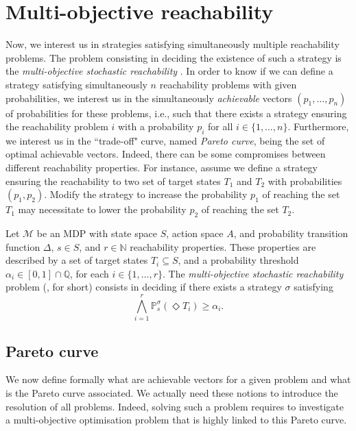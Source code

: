 \section{Multi-objective reachability}
\label{mosr-section}
Now, we interest us in strategies satisfying simultaneously multiple reachability problems.
The problem consisting in deciding the existence of
such a strategy is the \textit{multi-objective stochastic reachability} \cite{DBLP:journals/lmcs/EtessamiKVY08}.
In order to know if we can define a strategy satisfying simultaneously $n$ reachability problems with given probabilities, we interest us in the simultaneously \textit{achievable} vectors $(p_1, \dots, p_n)$ of probabilities for these problems, i.e., such that there exists a strategy ensuring the reachability problem $i$ with a probability $p_i$ for all $i \in \{1, \dots, n\}$.
Furthermore, we interest us in the ``trade-off" curve, named \textit{Pareto curve}, being the set of optimal achievable vectors.
Indeed, there can be some compromises between different reachability properties. For instance,
assume we define a strategy ensuring the reachability to two set of target states $T_1$ and $T_2$ with probabilities $(p_1, p_2)$.
 Modify the strategy to increase the probability $p_1$ of reaching the set $T_1$ may necessitate to lower the probability $p_2$ of reaching the set $T_2$.

\begin{definition}
  Let $\mathcal{M}$ be an MDP with state space $S$, action space $A$, and probability transition function $\Delta$, $s \in S$, and $r \in \mathbb{N}$ reachability properties.
  These properties are described by a set of target states $T_i \subseteq S$, and a probability threshold $\alpha_i \in [0, 1] \cap \mathbb{Q}$, for each $i \in \{1, \dots, r\}$.
  The \textit{multi-objective stochastic reachability} problem (\MOSR{}, for short) consists in deciding if there exists a strategy $\sigma$ satisfying
  \[
    \bigwedge_{i=1}^r \mathbb{P}^\sigma_s(\Diamond T_i) \geq \alpha_i.
  \]
\end{definition}


\subsection{Pareto curve}\label{le-pareto}
We now define formally what are achievable vectors for a given \MOSR{} problem and what is the Pareto curve associated.
We actually need these notions to introduce the resolution of all \MOSR{} problems.
Indeed, solving such a problem requires to investigate a multi-objective optimisation problem that is highly linked to this Pareto curve.\\

